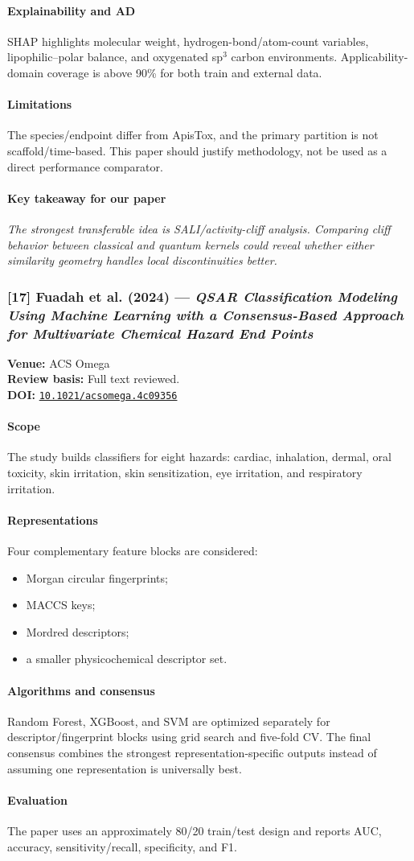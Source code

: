 \documentclass[11pt]{article}
\newcommand{\reviewfield}[2]{\paragraph{#1}#2}
\newcommand{\keytakeaway}[1]{\paragraph{Key takeaway for our paper}\emph{#1}}
\newcommand{\paperdoi}[1]{\href{https://doi.org/#1}{\texttt{#1}}}
\begin{document}
\reviewfield{Explainability and AD}{
SHAP highlights molecular weight, hydrogen-bond/atom-count variables, lipophilic--polar balance, and oxygenated sp$^3$ carbon environments. Applicability-domain coverage is above 90\% for both train and external data.
}

\reviewfield{Limitations}{
The species/endpoint differ from ApisTox, and the primary partition is not scaffold/time-based. This paper should justify methodology, not be used as a direct performance comparator.
}

\keytakeaway{The strongest transferable idea is SALI/activity-cliff analysis. Comparing cliff behavior between classical and quantum kernels could reveal whether either similarity geometry handles local discontinuities better.}

\subsubsection{[17] Fuadah et al. (2024) --- \textit{QSAR Classification Modeling Using Machine Learning with a Consensus-Based Approach for Multivariate Chemical Hazard End Points}}
\textbf{Venue:} ACS Omega\\
\textbf{Review basis:} Full text reviewed.\\
\textbf{DOI:} \paperdoi{10.1021/acsomega.4c09356}

\reviewfield{Scope}{
The study builds classifiers for eight hazards: cardiac, inhalation, dermal, oral toxicity, skin irritation, skin sensitization, eye irritation, and respiratory irritation.
}

\reviewfield{Representations}{
Four complementary feature blocks are considered:
\begin{itemize}
    \item Morgan circular fingerprints;
    \item MACCS keys;
    \item Mordred descriptors;
    \item a smaller physicochemical descriptor set.
\end{itemize}
}

\reviewfield{Algorithms and consensus}{
Random Forest, XGBoost, and SVM are optimized separately for descriptor/fingerprint blocks using grid search and five-fold CV. The final consensus combines the strongest representation-specific outputs instead of assuming one representation is universally best.
}

\reviewfield{Evaluation}{
The paper uses an approximately 80/20 train/test design and reports AUC, accuracy, sensitivity/recall, specificity, and F1.
}
\end{document}
